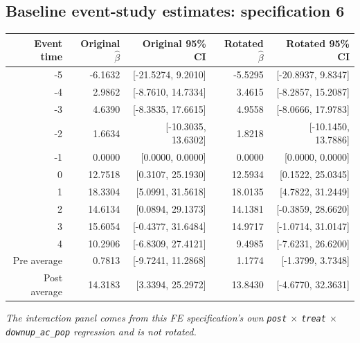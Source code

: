 \documentclass[10pt]{article}
\begin{document}
\subsection*{Baseline event-study estimates: specification 6}
\begin{center}
\scriptsize
\begin{tabular}{r rr rr}
\toprule
Event time & Original $\hat\beta$ & Original 95\% CI & Rotated $\hat\beta$ & Rotated 95\% CI \\
\midrule
-5 & -6.1632 & [-21.5274, 9.2010] & -5.5295 & [-20.8937, 9.8347] \\
-4 & 2.9862 & [-8.7610, 14.7334] & 3.4615 & [-8.2857, 15.2087] \\
-3 & 4.6390 & [-8.3835, 17.6615] & 4.9558 & [-8.0666, 17.9783] \\
-2 & 1.6634 & [-10.3035, 13.6302] & 1.8218 & [-10.1450, 13.7886] \\
-1 & 0.0000 & [0.0000, 0.0000] & 0.0000 & [0.0000, 0.0000] \\
0 & 12.7518 & [0.3107, 25.1930] & 12.5934 & [0.1522, 25.0345] \\
1 & 18.3304 & [5.0991, 31.5618] & 18.0135 & [4.7822, 31.2449] \\
2 & 14.6134 & [0.0894, 29.1373] & 14.1381 & [-0.3859, 28.6620] \\
3 & 15.6054 & [-0.4377, 31.6484] & 14.9717 & [-1.0714, 31.0147] \\
4 & 10.2906 & [-6.8309, 27.4121] & 9.4985 & [-7.6231, 26.6200] \\
\midrule
Pre average & 0.7813 & [-9.7241, 11.2868] & 1.1774 & [-1.3799, 3.7348] \\
Post average & 14.3183 & [3.3394, 25.2972] & 13.8430 & [-4.6770, 32.3631] \\
\bottomrule
\end{tabular}
\end{center}
\medskip
\textit{The interaction panel comes from this FE specification's own \texttt{post} $\times$ \texttt{treat} $\times$ \texttt{downup\_ac\_pop} regression and is not rotated.}
\clearpage
\end{document}
